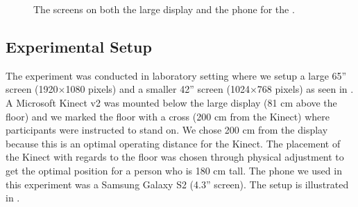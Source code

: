 \begin{figure}[H]
	\hspace{0.01\columnwidth}
	\caption{The screens on both the large display and the phone for the \accuracy.}
\end{figure}

\subsection{Experimental Setup} \label{sec:setup}
The experiment was conducted in laboratory setting where we setup a large 65'' screen (1920$\times$1080 pixels) and a smaller 42'' screen (1024$\times$768 pixels) as seen in .
A Microsoft Kinect v2 was mounted below the large display (81 cm above the floor) and we marked the floor with a cross (200 cm from the Kinect) where participants were instructed to stand on.
We chose 200 cm from the display because this is an optimal operating distance for the Kinect.
The placement of the Kinect with regards to the floor was chosen through physical adjustment to get the optimal position for a person who is 180 cm tall. 
The phone we used in this experiment was a Samsung Galaxy S2 (4.3'' screen).
The setup is illustrated in .

